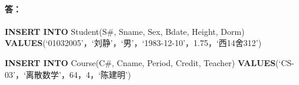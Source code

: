 \paragraph{答：}
\textbf{INSERT INTO} Student(S\#, Sname, Sex, Bdate, Height, Dorm) \textbf{VALUES}(‘01032005’，‘刘静’，‘男’，‘1983-12-10’，1.75，‘西14舍312’)

\textbf{INSERT INTO} Course(C\#, Cname, Period, Credit, Teacher) \textbf{VALUES}(‘CS-03’，‘离散数学’，64，4，‘陈建明’)